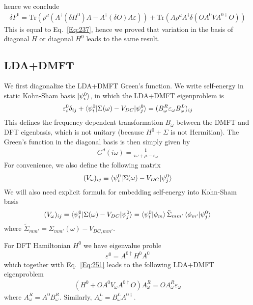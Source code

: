 \documentclass[aps,prb,floatfix,epsfig,singlecolumn,showpacs,preprintnumbers]{revtex4}
\newcommand{\Tr}{\mathrm{Tr}}
\begin{document}
hence we conclude
\begin{eqnarray}
\delta F^0 = \Tr(\rho^d
\left(
{A^{\dagger}} (\delta H^0) {A} -
{A^{\dagger}} (\delta O) A \varepsilon
\right))
+\Tr(A \rho^d A^\dagger \delta\left(O A^0 V A^{0\dagger} O\right))
\end{eqnarray}
This is equal to Eq.~\ref{Eq:237}, hence we proved that variation
in the basis of diagonal $H$ or diagonal $H^0$ leads to the same
result.


\subsection{LDA+DMFT}

We first diagonalize the LDA+DMFT Green's function. We write
self-energy in static Kohn-Sham basis $\ket{\psi_i^0}$, in which
the LDA+DMFT eigenproblem is
\begin{eqnarray}
\varepsilon^0_{i}\delta_{ij}+\braket{\psi_i^0|\Sigma(\omega)-V_{DC}|\psi_j^0}=(B^R_\omega\varepsilon_\omega B^L_\omega)_{ij}
\label{Eq:251}
\end{eqnarray}
This defines the frequency dependent transformation $B_\omega$ between
the DMFT and DFT eigenbasis, which is not unitary (because
$H^0+\Sigma$ is not Hermitian).
The Green's function in the diagonal basis is then simply given by
\begin{eqnarray}
G^d(i\omega)= \frac{1}{i\omega+\mu-\varepsilon_\omega}
\end{eqnarray}
For convenience, we also define the following matrix
\begin{eqnarray}
(V_\omega)_{ij}\equiv \braket{\psi_i^0|\Sigma(\omega)-V_{DC}|\psi_j^0}
\end{eqnarray}
We will also need explicit formula for embedding self-energy into
Kohn-Sham basis
\begin{eqnarray}
(V_\omega)_{ij}= \braket{\psi_i^0|\Sigma(\omega)-V_{DC}|\psi_j^0}=\braket{\psi_i^0|\phi_m}\tilde{\Sigma}_{mm'}\braket{\phi_{m'}|\psi_j^0}
\end{eqnarray}
where $\tilde{\Sigma}_{mm'}=\Sigma_{mm'}(\omega)-V_{DC,mm'}$.

For DFT Hamiltonian $H^0$ we have eigenvalue proble
\begin{eqnarray}
\varepsilon^0 = A^{0\dagger} H^0 A^0
\end{eqnarray}
which together with Eq.~\ref{Eq:251} leads to the following LDA+DMFT
eigenproblem
\begin{eqnarray}
(H^0 + O A^0 V_\omega A^{0\dagger} O) A^R_\omega = O A^R_\omega\varepsilon_\omega
\label{Eq:256}
\end{eqnarray}
where $A^R_\omega = A^0 B^R_\omega$. Similarly, $A^L_\omega = B^L_\omega A^{0\dagger}$.
\end{document}
